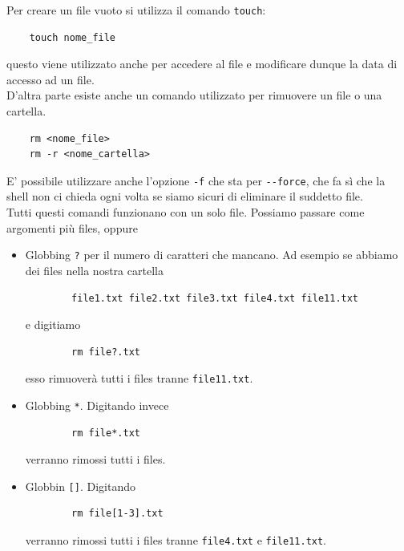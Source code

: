 \documentclass[11pt]{book}
\begin{document}
Per creare un file vuoto si utilizza il comando \verb"touch":
\begin{verbatim}
	touch nome_file
\end{verbatim}
questo viene utilizzato anche per accedere al file e modificare dunque la data di accesso ad un file. \\
D'altra parte esiste anche un comando utilizzato per rimuovere un file o una cartella. 
\begin{verbatim}
	rm <nome_file>
	rm -r <nome_cartella>
\end{verbatim}

E' possibile utilizzare anche l'opzione \verb"-f" che sta per \verb"--force", che fa sì che la shell non ci chieda ogni volta se siamo sicuri di eliminare il suddetto file. \\
Tutti questi comandi funzionano con un solo file. Possiamo passare come argomenti più files, oppure
\begin{itemize}
	\item Globbing \verb"?" per il numero di caratteri che mancano. Ad esempio se abbiamo dei files nella nostra cartella
	\begin{verbatim}
		file1.txt file2.txt file3.txt file4.txt file11.txt
	\end{verbatim}
	e digitiamo 
	\begin{verbatim}
		rm file?.txt
	\end{verbatim}
	esso rimuoverà tutti i files tranne \verb"file11.txt".
	\item Globbing \verb"*". Digitando invece
	\begin{verbatim}
		rm file*.txt
	\end{verbatim}
	verranno rimossi tutti i files.
	\item Globbin \verb"[]". Digitando 
	\begin{verbatim}
		rm file[1-3].txt
	\end{verbatim}
	verranno rimossi tutti i files tranne \verb"file4.txt" e \verb"file11.txt".
\end{itemize}
\end{document}
